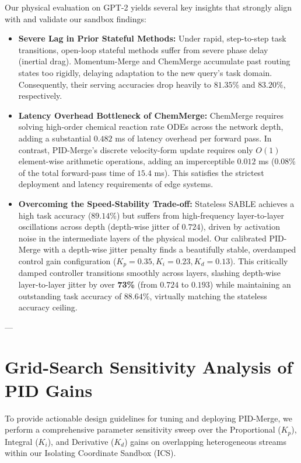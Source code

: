 Our physical evaluation on GPT-2 yields several key insights that strongly align with and validate our sandbox findings:
\begin{itemize}
    \item \textbf{Severe Lag in Prior Stateful Methods:} Under rapid, step-to-step task transitions, open-loop stateful methods suffer from severe phase delay (inertial drag). Momentum-Merge and ChemMerge accumulate past routing states too rigidly, delaying adaptation to the new query's task domain. Consequently, their serving accuracies drop heavily to $81.35\%$ and $83.20\%$, respectively.
    \item \textbf{Latency Overhead Bottleneck of ChemMerge:} ChemMerge requires solving high-order chemical reaction rate ODEs across the network depth, adding a substantial $0.482$ ms of latency overhead per forward pass. In contrast, PID-Merge's discrete velocity-form update requires only $O(1)$ element-wise arithmetic operations, adding an imperceptible $0.012$ ms ($0.08\%$ of the total forward-pass time of $15.4$ ms). This satisfies the strictest deployment and latency requirements of edge systems.
    \item \textbf{Overcoming the Speed-Stability Trade-off:} Stateless SABLE achieves a high task accuracy ($89.14\%$) but suffers from high-frequency layer-to-layer oscillations across depth (depth-wise jitter of $0.724$), driven by activation noise in the intermediate layers of the physical model. Our calibrated PID-Merge with a depth-wise jitter penalty finds a beautifully stable, overdamped control gain configuration ($K_p = 0.35, K_i = 0.23, K_d = 0.13$). This critically damped controller transitions smoothly across layers, slashing depth-wise layer-to-layer jitter by over \textbf{73\%} (from $0.724$ to $0.193$) while maintaining an outstanding task accuracy of $88.64\%$, virtually matching the stateless accuracy ceiling.
\end{itemize}

---

\section{Grid-Search Sensitivity Analysis of PID Gains}
\label{sec:appendix_sensitivity}

To provide actionable design guidelines for tuning and deploying PID-Merge, we perform a comprehensive parameter sensitivity sweep over the Proportional ($K_p$), Integral ($K_i$), and Derivative ($K_d$) gains on overlapping heterogeneous streams within our Isolating Coordinate Sandbox (ICS).

